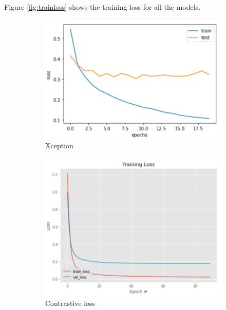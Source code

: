 Figure \ref{fig:trainloss} shows the training loss for all the models.

\begin{figure}[h]
  \centering
  \begin{subfigure}[b]{0.48\linewidth}
    \includegraphics[width=\linewidth]{figs/transfer_loss.png}
  \caption{Xception}
  \label{fig:transfer_loss}
  \end{subfigure}
   \hfill
  \begin{subfigure}[b]{0.48\linewidth}
  \includegraphics[width=\linewidth]{figs/con_loss.png}
  \caption{Contrastive loss}
  \label{fig:con_loss}
  \end{subfigure}
  \hfill
   \begin{subfigure}[b]{0.48\linewidth}

\end{subfigure}
\end{figure}
